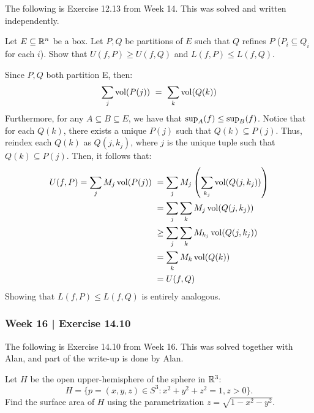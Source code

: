 The following is Exercise 12.13 from Week 14. This was solved and written
independently.
\vspace{-0.1in}
\begin{exr}[num=12.13]
    Let $ E \subseteq \mathbb{R}^{n} $ be a box. Let $ P, Q $ be partitions of $ E $
    such that $ Q $ refines $ P $ ($ P_{i} \subseteq Q_{i} $ for each $ i $).
    Show that $ U(f,P) \geq U(f,Q) $ and $ L(f,P) \leq L(f,Q) $.
\end{exr}
\vspace{-0.1in}
\begin{pf}
    Since $ P, Q $ both partition E, then:
    \begin{equation*}
        \sum_{j}\operatorname{vol}(P(j)) \ = \ \sum_{k}\operatorname{vol}(Q(k))
    \end{equation*}
    Furthermore, for any $ A \subseteq B \subseteq E $, we have that
    $ \textrm{sup}_{A}(f) \leq \textrm{sup}_{B}(f) $. Notice that for each $ Q(k) $,
    there exists a unique $ P(j) $ such that $ Q(k) \subseteq P(j) $. \vsp
    Thus, reindex each $ Q(k) $ as $ Q(j, k_{j}) $, where $ j $ is the unique
    tuple such that $ Q(k) \subseteq P(j) $. Then, it follows that:
    \begin{align*}
        U(f, P) = \sum_{j}M_{j}\operatorname{vol}(P(j)) & \ = \sum_{j}M_{j} \left( \sum_{k_{j}}
        \operatorname{vol}(Q(j, k_{j})) \right) \\
                                          & \ = \sum_{j}\sum_{k}M_{j}
                                          \operatorname{vol}(Q(j,k_{j})) \\
                                          & \ \geq \sum_{j}\sum_{k}M_{k_{j}}
                                          \operatorname{vol}(Q(j,k_{j})) \\
                                          & \ = \sum_{k}M_{k}\operatorname{vol}(Q(k)) \\
                                          & \ = U(f, Q)
    \end{align*}
    Showing that $ L(f,P) \leq L(f, Q) $ is entirely analogous.
\end{pf}
\subsubsection{Week 16 | Exercise 14.10}

The following is Exercise 14.10 from Week 16.
This was solved together with Alan, and part of the write-up is done by Alan.

\begin{exr}[num=14.10a]
    Let $H$ be the open upper-hemisphere of the sphere in $\mathbb{R}^3$:
        \[ H = \{p=(x,y,z)\in S^3 :x^2+y^2+z^2=1, z>0\}. \]
        Find the surface area of $H$ using the parametrization
        $z=\sqrt{1-x^2-y^2}$.
\end{exr}

